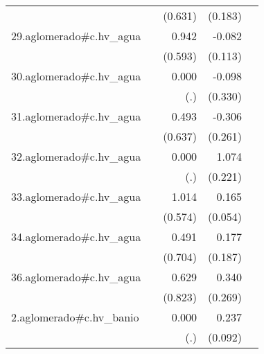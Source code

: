 {\begin{longtable}{l*{4}{D{.}{.}{-1}}}
            &                     &     (0.631)         &     (0.183)         &                     \\
\addlinespace
29.aglomerado#c.hv\_agua&                     &       0.942         &      -0.082         &                     \\
            &                     &     (0.593)         &     (0.113)         &                     \\
\addlinespace
30.aglomerado#c.hv\_agua&                     &       0.000         &      -0.098         &                     \\
            &                     &         (.)         &     (0.330)         &                     \\
\addlinespace
31.aglomerado#c.hv\_agua&                     &       0.493         &      -0.306         &                     \\
            &                     &     (0.637)         &     (0.261)         &                     \\
\addlinespace
32.aglomerado#c.hv\_agua&                     &       0.000         &       1.074\sym{***}&                     \\
            &                     &         (.)         &     (0.221)         &                     \\
\addlinespace
33.aglomerado#c.hv\_agua&                     &       1.014         &       0.165\sym{**} &                     \\
            &                     &     (0.574)         &     (0.054)         &                     \\
\addlinespace
34.aglomerado#c.hv\_agua&                     &       0.491         &       0.177         &                     \\
            &                     &     (0.704)         &     (0.187)         &                     \\
\addlinespace
36.aglomerado#c.hv\_agua&                     &       0.629         &       0.340         &                     \\
            &                     &     (0.823)         &     (0.269)         &                     \\
\addlinespace
2.aglomerado#c.hv\_banio&                     &       0.000         &       0.237\sym{**} &                     \\
            &                     &         (.)         &     (0.092)         &                     \\

\end{longtable}}
